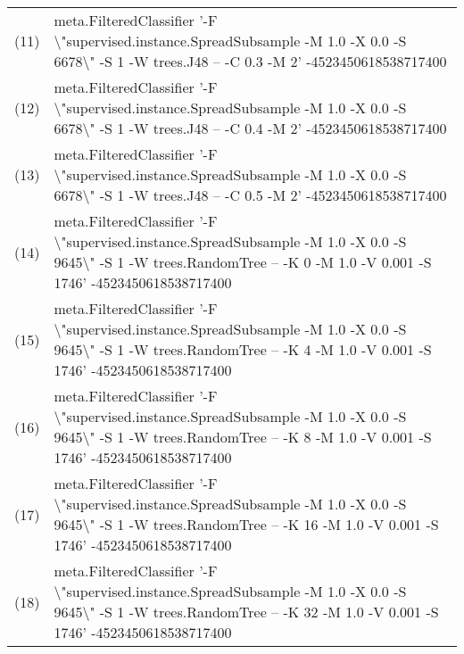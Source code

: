 \begin{table}[thb]
{\begin{tabular}{cl}
(11) & meta.FilteredClassifier '-F \textbackslash"supervised.instance.SpreadSubsample -M 1.0 -X 0.0 -S 6678\textbackslash" -S 1 -W trees.J48 -- -C 0.3 -M 2' -4523450618538717400 \\
(12) & meta.FilteredClassifier '-F \textbackslash"supervised.instance.SpreadSubsample -M 1.0 -X 0.0 -S 6678\textbackslash" -S 1 -W trees.J48 -- -C 0.4 -M 2' -4523450618538717400 \\
(13) & meta.FilteredClassifier '-F \textbackslash"supervised.instance.SpreadSubsample -M 1.0 -X 0.0 -S 6678\textbackslash" -S 1 -W trees.J48 -- -C 0.5 -M 2' -4523450618538717400 \\
(14) & meta.FilteredClassifier '-F \textbackslash"supervised.instance.SpreadSubsample -M 1.0 -X 0.0 -S 9645\textbackslash" -S 1 -W trees.RandomTree -- -K 0 -M 1.0 -V 0.001 -S 1746' -4523450618538717400 \\
(15) & meta.FilteredClassifier '-F \textbackslash"supervised.instance.SpreadSubsample -M 1.0 -X 0.0 -S 9645\textbackslash" -S 1 -W trees.RandomTree -- -K 4 -M 1.0 -V 0.001 -S 1746' -4523450618538717400 \\
(16) & meta.FilteredClassifier '-F \textbackslash"supervised.instance.SpreadSubsample -M 1.0 -X 0.0 -S 9645\textbackslash" -S 1 -W trees.RandomTree -- -K 8 -M 1.0 -V 0.001 -S 1746' -4523450618538717400 \\
(17) & meta.FilteredClassifier '-F \textbackslash"supervised.instance.SpreadSubsample -M 1.0 -X 0.0 -S 9645\textbackslash" -S 1 -W trees.RandomTree -- -K 16 -M 1.0 -V 0.001 -S 1746' -4523450618538717400 \\
(18) & meta.FilteredClassifier '-F \textbackslash"supervised.instance.SpreadSubsample -M 1.0 -X 0.0 -S 9645\textbackslash" -S 1 -W trees.RandomTree -- -K 32 -M 1.0 -V 0.001 -S 1746' -4523450618538717400 \\
\end{tabular}
}
\end{table}


